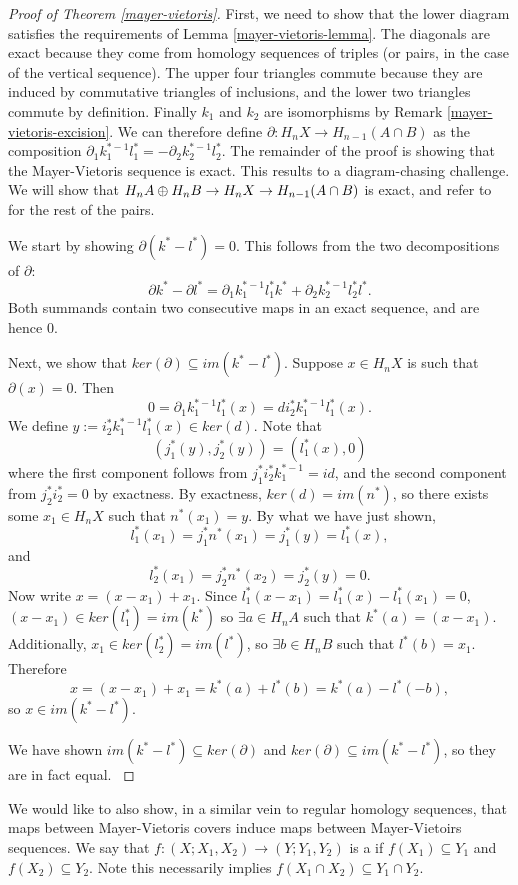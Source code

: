 \begin{proof}[Proof of Theorem \ref{mayer-vietoris}]
First, we need to show that the lower diagram satisfies the requirements of Lemma \ref{mayer-vietoris-lemma}. The diagonals are exact because they come from homology sequences of triples (or pairs, in the case of the vertical sequence). The upper four triangles commute because they are induced by commutative triangles of inclusions, and the lower two triangles commute by definition. Finally $k_1$ and $k_2$ are isomorphisms by Remark \ref{mayer-vietoris-excision}. We can therefore define $\partial:H_nX\rightarrow H_{n-1}(A\cap B)$ as the composition $\partial_1k_1^{*-1}l_1^*=-\partial_2k_2^{*-1}l_2^*$. The remainder of the proof is showing that the Mayer-Vietoris sequence is exact. This results to a diagram-chasing challenge. We will show that $H_nA\oplus H_nB \rightarrow H_nX \rightarrow H_{n-1}(A\cap B)$ is exact, and refer to \cite{Eilenberg} for the rest of the pairs. 

We start by showing $\partial(k^*-l^*)=0$. This follows from the two decompositions of $\partial$:
$$\partial k^*-\partial l^*=\partial_1k_1^{*-1}l_1^*k^*+\partial_2k_2^{*-1}l_2^*l^*.$$ Both summands contain two consecutive maps in an exact sequence, and are hence $0$.

Next, we show that $ker(\partial)\subseteq im(k^*-l^*)$. Suppose $x\in H_nX$ is such that $\partial(x)=0$. Then $$0=\partial_1k_1^{*-1}l_1^*(x)=di^*_2k_1^{*-1}l_1^*(x).$$ We define $y:=i^*_2k_1^{*-1}l_1^*(x)\in ker(d)$. 
Note that $$(j_1^*(y),j_2^*(y))=(l_1^*(x),0)$$
where the first component follows from $j_1^*i^*_2k_1^{*-1}=id$, and the second component from $j_2^*i_2^*=0$ by exactness. By exactness, $ker(d)=im(n^*)$, so there exists some $x_1\in H_nX $ such that $n^*(x_1)=y$. By what we have just shown, $$l_1^*(x_1)=j_1^*n^*(x_1)=j_1^*(y)=l_1^*(x),$$ and $$l_2^*(x_1)=j_2^*n^*(x_2)=j_2^*(y)=0.$$ Now write $x=(x-x_1)+x_1$. Since $l_1^*(x-x_1)=l_1^*(x)-l_1^*(x_1)=0$, $(x-x_1)\in ker(l_1^*)=im(k^*)$ so $\exists a\in H_nA$ such that $k^*(a)=(x-x_1)$. Additionally, $x_1\in ker(l_2^*)=im(l^*)$, so $\exists b\in H_nB$ such that $l^*(b)=x_1$. Therefore $$x=(x-x_1)+x_1=k^*(a)+l^*(b)=k^*(a)-l^*(-b),$$ so $x\in im(k^*-l^*).$

We have shown $im(k^*-l^*)\subseteq ker(\partial)$ and $ker(\partial)\subseteq im(k^*-l^*)$, so they are in fact equal.
\cite{Eilenberg}
\end{proof}

We would like to also show, in a similar vein to regular homology sequences, that maps between Mayer-Vietoris covers induce maps between Mayer-Vietoirs sequences. We say that $f:(X;X_1,X_2)\rightarrow (Y;Y_1,Y_2)$ is a  if $f(X_1)\subseteq Y_1$ and $f(X_2)\subseteq Y_2$. Note this necessarily implies $f(X_1\cap X_2)\subseteq Y_1\cap Y_2$.

